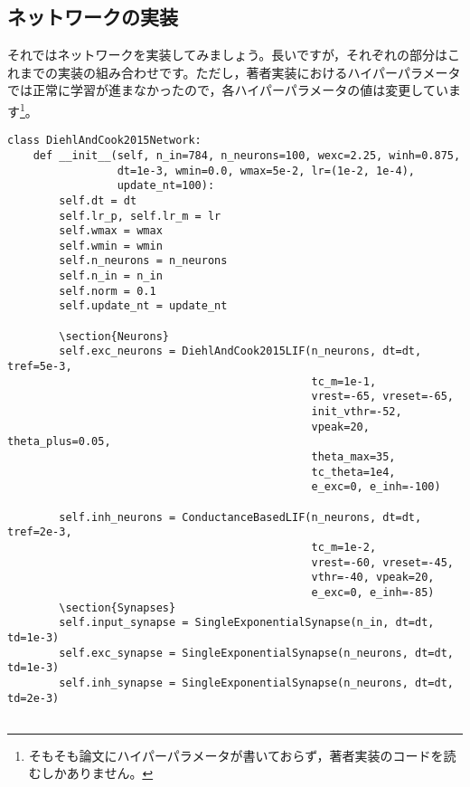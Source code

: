 \subsection{ネットワークの実装}
それではネットワークを実装してみましょう。長いですが，それぞれの部分はこれまでの実装の組み合わせです。ただし，著者実装におけるハイパーパラメータでは正常に学習が進まなかったので，各ハイパーパラメータの値は変更しています\footnote{そもそも論文にハイパーパラメータが書いておらず，著者実装のコードを読むしかありません。}。
\begin{verbatim}
class DiehlAndCook2015Network:
    def __init__(self, n_in=784, n_neurons=100, wexc=2.25, winh=0.875,
                 dt=1e-3, wmin=0.0, wmax=5e-2, lr=(1e-2, 1e-4),
                 update_nt=100):
        self.dt = dt
        self.lr_p, self.lr_m = lr
        self.wmax = wmax
        self.wmin = wmin
        self.n_neurons = n_neurons
        self.n_in = n_in
        self.norm = 0.1
        self.update_nt = update_nt

        \section{Neurons}
        self.exc_neurons = DiehlAndCook2015LIF(n_neurons, dt=dt, tref=5e-3,
                                               tc_m=1e-1,
                                               vrest=-65, vreset=-65, 
                                               init_vthr=-52,
                                               vpeak=20, theta_plus=0.05,
                                               theta_max=35,
                                               tc_theta=1e4,
                                               e_exc=0, e_inh=-100)

        self.inh_neurons = ConductanceBasedLIF(n_neurons, dt=dt, tref=2e-3,
                                               tc_m=1e-2,
                                               vrest=-60, vreset=-45,
                                               vthr=-40, vpeak=20,
                                               e_exc=0, e_inh=-85)
        \section{Synapses}
        self.input_synapse = SingleExponentialSynapse(n_in, dt=dt, td=1e-3)
        self.exc_synapse = SingleExponentialSynapse(n_neurons, dt=dt, td=1e-3)
        self.inh_synapse = SingleExponentialSynapse(n_neurons, dt=dt, td=2e-3)
        

\end{verbatim}

